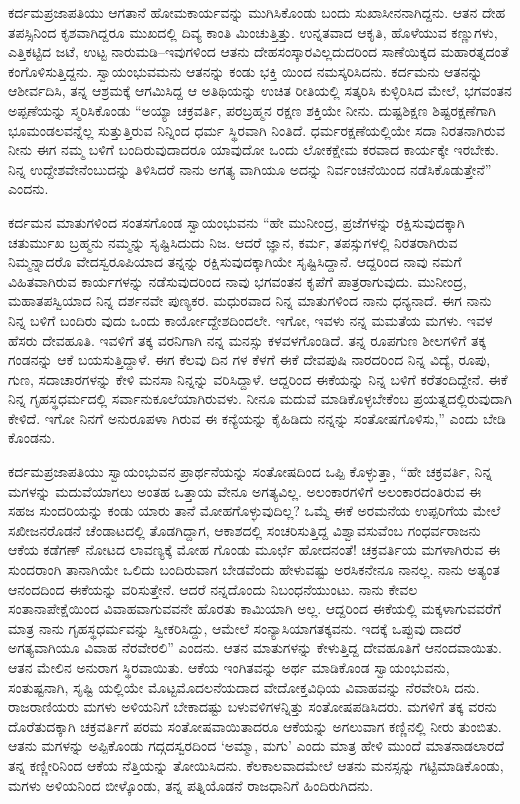 ಕರ್ದಮಪ್ರಜಾಪತಿಯು ಆಗತಾನೆ ಹೋಮಕಾರ್ಯವನ್ನು ಮುಗಿಸಿಕೊಂಡು ಬಂದು ಸುಖಾಸೀನನಾಗಿದ್ದನು. ಆತನ ದೇಹ ತಪಸ್ಸಿನಿಂದ ಕೃಶವಾಗಿದ್ದರೂ ಮುಖದಲ್ಲಿ ದಿವ್ಯ ಕಾಂತಿ ಮಿಂಚುತ್ತಿತ್ತು. ಉನ್ನತವಾದ ಆಕೃತಿ, ಹೊಳೆಯುವ ಕಣ್ಣುಗಳು, ಎತ್ತಿಕಟ್ಟಿದ ಜಟೆ, ಉಟ್ಟ ನಾರುಮಡಿ–ಇವುಗಳಿಂದ ಆತನು ದೇಹಸಂಸ್ಕಾರವಿಲ್ಲದುದರಿಂದ ಸಾಣೆಯಿಕ್ಕದ ಮಹಾರತ್ನದಂತೆ ಕಂಗೊಳಿಸುತ್ತಿದ್ದನು. ಸ್ವಾಯಂಭುವಮನು ಆತನನ್ನು ಕಂಡು ಭಕ್ತಿ ಯಿಂದ ನಮಸ್ಕರಿಸಿದನು. ಕರ್ದಮನು ಆತನನ್ನು ಆಶೀರ್ವದಿಸಿ, ತನ್ನ ಆಶ್ರಮಕ್ಕೆ ಆಗಮಿಸಿದ್ದ ಆ ಅತಿಥಿಯನ್ನು ಉಚಿತ ರೀತಿಯಲ್ಲಿ ಸತ್ಕರಿಸಿ ಕುಳ್ಳಿರಿಸಿದ ಮೇಲೆ, ಭಗವಂತನ ಅಪ್ಪಣೆಯನ್ನು ಸ್ಮರಿಸಿಕೊಂಡು “ಅಯ್ಯಾ ಚಕ್ರವರ್ತಿ, ಪರಬ್ರಹ್ಮನ ರಕ್ಷಣ ಶಕ್ತಿಯೇ ನೀನು. ದುಷ್ಟಶಿಕ್ಷಣ ಶಿಷ್ಟರಕ್ಷಣೆಗಾಗಿ ಭೂಮಂಡಲವನ್ನೆಲ್ಲ ಸುತ್ತುತ್ತಿರುವ ನಿನ್ನಿಂದ ಧರ್ಮ ಸ್ಥಿರವಾಗಿ ನಿಂತಿದೆ. ಧರ್ಮರಕ್ಷಣೆಯಲ್ಲಿಯೇ ಸದಾ ನಿರತನಾಗಿರುವ ನೀನು ಈಗ ನಮ್ಮ ಬಳಿಗೆ ಬಂದಿರುವುದಾದರೂ ಯಾವುದೋ ಒಂದು ಲೋಕಕ್ಷೇಮ ಕರವಾದ ಕಾರ್ಯಕ್ಕೇ ಇರಬೇಕು. ನಿನ್ನ ಉದ್ದೇಶವೇನೆಂಬುದನ್ನು ತಿಳಿಸಿದರೆ ನಾನು ಅಗತ್ಯ ವಾಗಿಯೂ ಅದನ್ನು ನಿರ್ವಂಚನೆಯಿಂದ ನಡೆಸಿಕೊಡುತ್ತೇನೆ” ಎಂದನು.

ಕರ್ದಮನ ಮಾತುಗಳಿಂದ ಸಂತಸಗೊಂಡ ಸ್ವಾಯಂಭುವನು “ಹೇ ಮುನೀಂದ್ರ, ಪ್ರಜೆಗಳನ್ನು ರಕ್ಷಿಸುವುದಕ್ಕಾಗಿ ಚತುರ್ಮುಖ ಬ್ರಹ್ಮನು ನಮ್ಮನ್ನು ಸೃಷ್ಟಿಸಿದುದು ನಿಜ. ಆದರೆ ಜ್ಞಾನ, ಕರ್ಮ, ತಪಸ್ಸುಗಳಲ್ಲಿ ನಿರತರಾಗಿರುವ ನಿಮ್ಮನ್ನಾದರೊ ವೇದಸ್ವರೂಪಿಯಾದ ತನ್ನನ್ನು ರಕ್ಷಿಸುವುದಕ್ಕಾಗಿಯೇ ಸೃಷ್ಟಿಸಿದ್ದಾನೆ. ಆದ್ದರಿಂದ ನಾವು ನಮಗೆ ವಿಹಿತವಾಗಿರುವ ಕಾರ್ಯಗಳನ್ನು ನಡೆಸುವುದರಿಂದ ನಾವು ಭಗವಂತನ ಕೃಪೆಗೆ ಪಾತ್ರರಾಗುವುದು. ಮುನೀಂದ್ರ, ಮಹಾತಪಸ್ವಿಯಾದ ನಿನ್ನ ದರ್ಶನವೇ ಪುಣ್ಯಕರ. ಮಧುರವಾದ ನಿನ್ನ ಮಾತುಗಳಿಂದ ನಾನು ಧನ್ಯನಾದೆ. ಈಗ ನಾನು ನಿನ್ನ ಬಳಿಗೆ ಬಂದಿರು ವುದು ಒಂದು ಕಾರ್ಯೋದ್ದೇಶದಿಂದಲೇ. ಇಗೋ, ಇವಳು ನನ್ನ ಮಮತೆಯ ಮಗಳು. ಇವಳ ಹೆಸರು ದೇವಹೂತಿ. ಇವಳಿಗೆ ತಕ್ಕ ವರನಿಗಾಗಿ ನನ್ನ ಮನಸ್ಸು ಕಳವಳಗೊಂಡಿದೆ. ತನ್ನ ರೂಪಗುಣ ಶೀಲಗಳಿಗೆ ತಕ್ಕ ಗಂಡನನ್ನು ಆಕೆ ಬಯಸುತ್ತಿದ್ದಾಳೆ. ಈಗ ಕೆಲವು ದಿನ ಗಳ ಕೆಳಗೆ ಈಕೆ ದೇವಪುಷಿ ನಾರದರಿಂದ ನಿನ್ನ ವಿದ್ಯೆ, ರೂಪು, ಗುಣ, ಸದಾಚಾರಗಳನ್ನು ಕೇಳಿ ಮನಸಾ ನಿನ್ನನ್ನು ವರಿಸಿದ್ದಾಳೆ. ಆದ್ದರಿಂದ ಈಕೆಯನ್ನು ನಿನ್ನ ಬಳಿಗೆ ಕರೆತಂದಿದ್ದೇನೆ. ಈಕೆ ನಿನ್ನ ಗೃಹಸ್ಥಧರ್ಮದಲ್ಲಿ ಸರ್ವಾನುಕೂಲೆಯಾಗಿರುವಳು. ನೀನೂ ಮದುವೆ ಮಾಡಿಕೊಳ್ಳಬೇಕೆಂಬ ಪ್ರಯತ್ನದಲ್ಲಿರುವುದಾಗಿ ಕೇಳಿದೆ. ಇಗೋ ನಿನಗೆ ಅನುರೂಪಳಾ ಗಿರುವ ಈ ಕನ್ಯೆಯನ್ನು ಕೈಹಿಡಿದು ನನ್ನನ್ನು ಸಂತೋಷಗೊಳಿಸು,” ಎಂದು ಬೇಡಿ ಕೊಂಡನು. 

ಕರ್ದಮಪ್ರಜಾಪತಿಯು ಸ್ವಾಯಂಭುವನ ಪ್ರಾರ್ಥನೆಯನ್ನು ಸಂತೋಷದಿಂದ ಒಪ್ಪಿ ಕೊಳ್ಳುತ್ತಾ, “ಹೇ ಚಕ್ರವರ್ತಿ, ನಿನ್ನ ಮಗಳನ್ನು ಮದುವೆಯಾಗಲು ಅಂತಹ ಒತ್ತಾಯ ವೇನೂ ಅಗತ್ಯವಿಲ್ಲ. ಅಲಂಕಾರಗಳಿಗೆ ಅಲಂಕಾರದಂತಿರುವ ಈ ಸಹಜ ಸುಂದರಿಯನ್ನು ಕಂಡು ಯಾರು ತಾನೆ ಮೋಹಗೊಳ್ಳುವುದಿಲ್ಲ? ಒಮ್ಮೆ ಈಕೆ ಅರಮನೆಯ ಉಪ್ಪರಿಗೆಯ ಮೇಲೆ ಸಖೀಜನರೊಡನೆ ಚೆಂಡಾಟದಲ್ಲಿ ತೊಡಗಿದ್ದಾಗ, ಆಕಾಶದಲ್ಲಿ ಸಂಚರಿಸುತ್ತಿದ್ದ ವಿಶ್ವಾವಸುವೆಂಬ ಗಂಧರ್ವರಾಜನು ಆಕೆಯ ಕಡೆಗಣ್ ನೋಟದ ಲಾವಣ್ಯಕ್ಕೆ ಮೋಹ ಗೊಂಡು ಮೂರ್ಛೆ ಹೋದನಂತೆ! ಚಕ್ರವರ್ತಿಯ ಮಗಳಾಗಿರುವ ಈ ಸುಂದರಾಂಗಿ ತಾನಾಗಿಯೇ ಒಲಿದು ಬಂದಿರುವಾಗ ಬೇಡವೆಂದು ಹೇಳುವಷ್ಟು ಅರಸಿಕನೇನೂ ನಾನಲ್ಲ. ನಾನು ಅತ್ಯಂತ ಆನಂದದಿಂದ ಈಕೆಯನ್ನು ವರಿಸುತ್ತೇನೆ. ಆದರೆ ನನ್ನದೊಂದು ನಿಬಂಧನೆಯುಂಟು. ನಾನು ಕೇವಲ ಸಂತಾನಾಪೇಕ್ಷೆಯಿಂದ ವಿವಾಹವಾಗುವವನೇ ಹೊರತು ಕಾಮಿಯಾಗಿ ಅಲ್ಲ. ಆದ್ದರಿಂದ ಈಕೆಯಲ್ಲಿ ಮಕ್ಕಳಾಗುವವರೆಗೆ ಮಾತ್ರ ನಾನು ಗೃಹಸ್ಥಧರ್ಮವನ್ನು ಸ್ವೀಕರಿಸಿದ್ದು, ಆಮೇಲೆ ಸಂನ್ಯಾಸಿಯಾಗತಕ್ಕವನು. ಇದಕ್ಕೆ ಒಪ್ಪುವು ದಾದರೆ ಅಗತ್ಯವಾಗಿಯೂ ವಿವಾಹ ನೆರವೇರಲಿ” ಎಂದನು. ಆತನ ಮಾತುಗಳನ್ನು ಕೇಳುತ್ತಿದ್ದ ದೇವಹೂತಿಗೆ ಆನಂದವಾಯಿತು. ಆತನ ಮೇಲಿನ ಅನುರಾಗ ಸ್ಥಿರವಾಯಿತು. ಆಕೆಯ ಇಂಗಿತವನ್ನು ಅರ್ಥ ಮಾಡಿಕೊಂಡ ಸ್ವಾಯಂಭುವನು, ಸಂತುಷ್ಟನಾಗಿ, ಸೃಷ್ಟಿ ಯಲ್ಲಿಯೇ ಮೊಟ್ಟಮೊದಲನೆಯದಾದ ವೇದೋಕ್ತವಿಧಿಯ ವಿವಾಹವನ್ನು ನೆರವೇರಿಸಿ ದನು. ರಾಜರಾಣಿಯರು ಮಗಳು ಅಳಿಯನಿಗೆ ಬೇಕಾದಷ್ಟು ಬಳುವಳಿಗಳನ್ನಿತ್ತು ಸಂತೋಷಪಡಿಸಿದರು. ಮಗಳಿಗೆ ತಕ್ಕ ವರನು ದೊರೆತುದಕ್ಕಾಗಿ ಚಕ್ರವರ್ತಿಗೆ ಪರಮ ಸಂತೋಷವಾಯಿತಾದರೂ ಆಕೆಯನ್ನು ಅಗಲುವಾಗ ಕಣ್ಣಿನಲ್ಲಿ ನೀರು ತುಂಬಿತು. ಆತನು ಮಗಳನ್ನು ಅಪ್ಪಿಕೊಂಡು ಗದ್ಗದಸ್ವರದಿಂದ ‘ಅಮ್ಮಾ, ಮಗು’ ಎಂದು ಮಾತ್ರ ಹೇಳಿ ಮುಂದೆ ಮಾತನಾಡಲಾರದೆ ತನ್ನ ಕಣ್ಣೀರಿನಿಂದ ಆಕೆಯ ನೆತ್ತಿಯನ್ನು ತೋಯಿಸಿದನು. ಕೆಲಕಾಲವಾದಮೇಲೆ ಆತನು ಮನಸ್ಸನ್ನು ಗಟ್ಟಿಮಾಡಿಕೊಂಡು, ಮಗಳು ಅಳಿಯನಿಂದ ಬೀಳ್ಕೊಂಡು, ತನ್ನ ಪತ್ನಿಯೊಡನೆ ರಾಜಧಾನಿಗೆ ಹಿಂದಿರುಗಿದನು.

